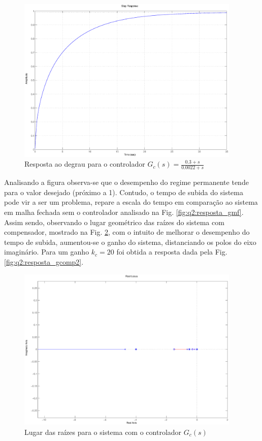 \begin{figure}[htb]
\centering
\includegraphics[width=0.95\textwidth]{imgs/questao2/resposta_gcomp1}
\caption{Resposta ao degrau para o controlador $G_c(s) = \frac{0.3+s}
                                                         {0.0022+s}$}
\label{fig:q2:resposta_gcomp1}
\end{figure}

Analisando a figura observa-se que o desempenho do regime permanente tende para
o valor desejado (próximo a 1). Contudo, o tempo de subida do sistema pode vir a
ser um problema, repare a escala do tempo em comparação ao sistema em malha
fechada sem o controlador analisado na Fig. \ref{fig:q2:resposta_gmf}. Assim
sendo, observando o lugar geométrico das raízes do sistema com compensador,
mostrado na Fig. \ref{fig:q2:rlocus_gcomp1}, com o intuito de melhorar o
desempenho do tempo de subida, aumentou-se o ganho do sistema, distanciando os
polos do eixo imaginário. Para um ganho $k_c = 20$ foi obtida a resposta dada
pela Fig. \ref{fig:q2:resposta_gcomp2}.

\begin{figure}[H]
\centering
\includegraphics[width=0.95\textwidth]{imgs/questao2/rlocus_gcma}
\caption{Lugar das raízes para o sistema com o controlador $G_c(s)$}
\label{fig:q2:rlocus_gcomp1}
\end{figure}
 
